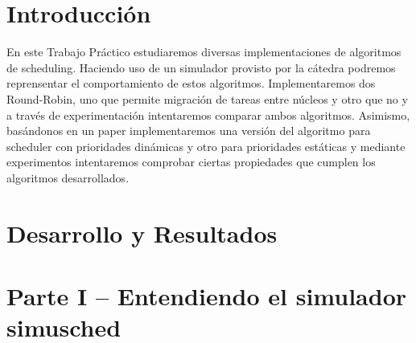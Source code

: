 \documentclass[a4paper,10pt,twoside]{article}
\begin{document}
\newpage




\tableofcontents

\newpage




\section{Introducción}

\indent \indent En este Trabajo Práctico estudiaremos diversas implementaciones de algoritmos de scheduling. 
Haciendo uso de un simulador provisto por la cátedra podremos reprensentar el comportamiento de estos algoritmos. 
Implementaremos dos Round-Robin, uno que permite migración de tareas entre núcleos y otro que no y a través de experimentación intentaremos comparar ambos algoritmos. 
Asimismo, basándonos en un paper implementaremos una versión del algoritmo para scheduler con prioridades
dinámicas y otro para prioridades estáticas y 
mediante experimentos intentaremos comprobar ciertas propiedades que cumplen los algoritmos desarrollados.\\


\newpage
\section{Desarrollo y Resultados}

\section{Parte I – Entendiendo el simulador simusched}


\newpage
\end{document}
